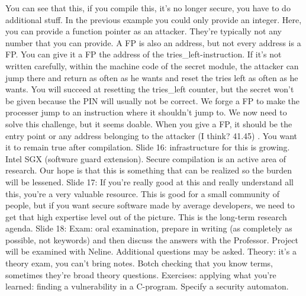 \documentclass[10pt,a4paper]{report}
\begin{document}
You can see that this, if you compile this, it's no longer secure, you have to do additional stuff. In the previous example you could only provide an integer. Here, you can provide a function pointer as an attacker. They're typically not any number that you can provide. A FP is also an address, but not every address is a FP. You can give it a FP the address of the tries\_left-instruction. If it's not written carefully, within the machine code of the secret module, the attacker can jump there and return as often as he wants and reset the tries left as often as he wants. You will succeed at resetting the tries\_left counter, but the secret won't be given because the PIN will usually not be correct. We forge a FP to make the processer jump to an instruction where it shouldn't jump to. We now need to solve this challenge, but it seems doable. When you give a FP, it should be the entry point or any address belonging to the attacker (I think? 41.45) .
You want it to remain true after compilation. 
Slide 16: infrastructure for this is growing. Intel SGX (software guard extension). 
Secure compilation is an active area of research. Our hope is that this is something that can be realized so the burden will be lessened. 
Slide 17: If you're really good at this and really understand all this, you're a very valuable resource. This is good for a small community of people, but if you want secure software made by average developers, we need to get that high expertise level out of the picture. This is the long-term research agenda. 
Slide 18: Exam:  oral examination, prepare in writing (as completely as possible, not keywords) and then discuss the answers with the Professor. Project will be examined with Neline. Additional questions may be asked.
Theory: it's a theory exam, you can't bring notes. Botch checking that you know terms, sometimes they're broad theory questions. Exercises: applying what you're learned: finding a vulnerability in a C-program. Specify a security automaton.
\end{document}
